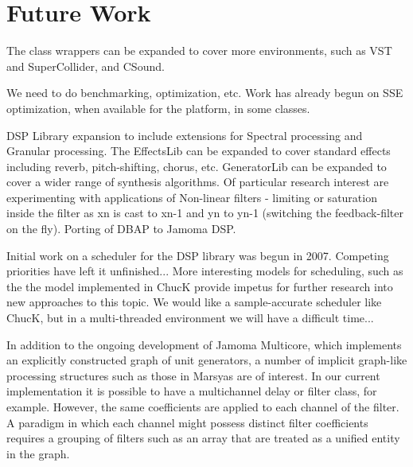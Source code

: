\documentclass[twoside,10pt]{article}
\begin{document}



\section{Future Work} %

The class wrappers can be expanded to cover more environments, such as VST and SuperCollider, and CSound.

We need to do benchmarking, optimization, etc.  Work has already begun on SSE optimization, when available for the platform, in some classes.

DSP Library expansion to include extensions for Spectral processing and Granular processing.  The EffectsLib can be expanded to cover standard effects including reverb, pitch-shifting, chorus, etc.  GeneratorLib can be expanded to cover a wider range of synthesis algorithms.  Of particular research interest are experimenting with applications of Non-linear filters - limiting or saturation inside the filter as xn is cast to xn-1 and yn to yn-1 (switching the feedback-filter on the fly).  Porting of DBAP to Jamoma DSP\cite{Lossius:2009}.

Initial work on a scheduler for the DSP library was begun in 2007.  Competing priorities have left it unfinished...  More interesting models for scheduling, such as the the model implemented in ChucK provide impetus for further research into new approaches to this topic.  We would like a sample-accurate scheduler like ChucK, but in a multi-threaded environment we will have a difficult time...


In addition to the ongoing development of Jamoma Multicore, which implements an explicitly constructed graph of unit generators, a number of implicit graph-like processing structures such as those in Marsyas are of interest. %
In our current implementation it is possible to have a multichannel delay or filter class, for example.  However, the same coefficients are applied to each channel of the filter.  A paradigm in which each channel might possess distinct filter coefficients requires a grouping of filters such as an array that are treated as a unified entity in the graph.
\end{document}
